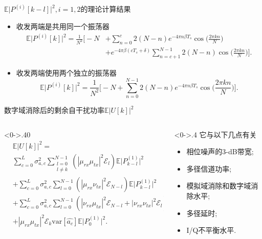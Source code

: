 \begin{frame}
	\begin{block}{$\mathbb{E}\big|P^{(i)}[k-l]\big|^2,i=1,2$的理论计算结果}
		\begin{itemize}
			\item 收发两端是共用同一个振荡器\begin{equation*}
			\begin{split}
			\mathbb{E}\big|P^{(i)}[k]\big|^2 =\frac{1}{N^2}\bigg[ -N&+\sum_{n=0}^{c} 2(N-n)e^{-4\pi n\beta T_s}\cos \big(\frac{2\pi kn}{N} \big) \\
			&+e^{-4\pi\beta(cT_s+\delta)}\sum_{n=c+1}^{N-1}2(N-n)\cos\big(\frac{2\pi kn}{N} \big)\bigg].
			\end{split}
			\end{equation*}
			\item 收发两端使用两个独立的振荡器\begin{equation*}
			\mathbb{E}\big|P^{(i)}[k]\big|^2 = \frac{1}{N^2}\bigg[ -N+\sum_{n=0}^{N-1} 2(N-n)e^{-4\pi n\beta T_s}\cos \big(\frac{2\pi kn}{N} \big)\bigg].
			\end{equation*}
		\end{itemize}
	\end{block}
\end{frame}

\begin{frame}{数字域消除后的剩余自干扰功率$\mathbb{E}|U[k]|^2$}
	\begin{columns}[T] %
		\begin{column}<0->{.40\textwidth}
			\begin{equation*}
			\begin{split}
			&\mathbb{E}|U[k]|^2 = \\
			&\sum_{c=0}^{L}\sigma_{a,c}^2\sum_{\substack{l=0 \\ l\neq k}}^{N-1}(|\mu_{rx}\mu_{tx}|^2\mathcal{E}_{l})\mathbb{E}\big| P^{(1)}_{k-l}\big|^2\\
			&+\sum_{c=0}^{L}\sigma_{a,c}^2\sum_{l=0}^{N-1}(|\mu_{rx}\nu_{tx}|^2\mathcal{E}_{N-l})\mathbb{E}\big| P^{(1)}_{k-l}\big|^2\\
			&+ \sum_{c=0}^{L}\sigma_{a,c}^2\sum_{l=0}^{N-1}(|\nu_{rx}\mu_{tx}|^2\mathcal{E}_{N-l}+|\nu_{rx}\nu_{tx}|^2\mathcal{E}_{l}) \mathbb{E}\big|P^{(2)}_{k-l}\big|^2 \\
			&+ |\mu_{rx}\mu_{tx}|^2\mathcal{E}_{k}\mathrm{var}[\widehat{a_c}]\mathbb{E}\big|P^{(1)}_{0}\big|^2.
			\end{split}
			\end{equation*}
		\end{column}%
		\hfill%
		\begin{column}<0->{.4\textwidth}
			它与以下几点有关
			\begin{itemize}
				\item 相位噪声的3-dB带宽;
				\item 多径信道功率;
				\item 模拟域消除和数字域消除水平;
				\item 多径延时;
				\item I/Q不平衡水平.
			\end{itemize}
		\end{column}%
	\end{columns}
\end{frame}
